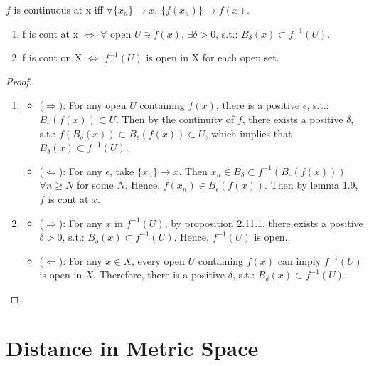 \begin{lemma}
    $f$ is continuous at x iff $\forall \{x_n\} \rightarrow x$, $\{f(x_n)\} \rightarrow f(x)$.
\end{lemma}

\begin{proposition}
    \begin{enumerate}
        \item f is cont at x $\Leftrightarrow$ $\forall$ open $U\ni f(x)$, $\exists \delta >0$, s.t.: $B_\delta (x) \subset f^{-1}(U)$.
        \item f is cont on X $\Leftrightarrow$ $f^{-1}(U)$ is open in X for each open set.
    \end{enumerate}
\end{proposition}

\begin{proof}
    \begin{enumerate}
        \item \begin{itemize}
            \item ($\Rightarrow$): For any open $U$ containing $f(x)$, there is a positive $\epsilon$, s.t.: $B_\epsilon (f(x)) \subset U$. Then by the continuity of $f$, there exists a positive $\delta$, s.t.: $f(B_\delta (x)) \subset B_\epsilon(f(x)) \subset U$, which implies that $B_\delta(x) \subset f^{-1}(U)$.
            \item ($\Leftarrow$): For any $\epsilon$, take $\{x_n\} \rightarrow x$. Then $x_n \in B_\delta \subset f^{-1}(B_\epsilon (f(x)))$ $\forall n \geq N$ for some $N$. Hence, $f(x_n) \in B_\epsilon (f(x))$. Then by lemma 1.9, $f$ is cont at $x$.
        \end{itemize}
        \item \begin{itemize}
            \item ($\Rightarrow$): For any $x$ in $f^{-1}(U)$, by proposition 2.11.1, there exists a positive $\delta>0$, s.t.: $B_\delta (x) \subset f^{-1}(U)$. Hence, $f^{-1}(U)$ is open.
            \item ($\Leftarrow$): For any $x \in X$, every open $U$ containing $f(x)$ can imply $f^{-1}(U)$ is open in $X$. Therefore, there is a positive $\delta$, s.t.: $B_\delta(x) \subset f^{-1}(U)$.
        \end{itemize}
    \end{enumerate}
\end{proof}

\section{Distance in Metric Space}

